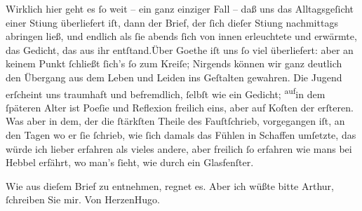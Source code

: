 \pstart
           Wirklich hier geht es{ }ſo weit – ein ganz einziger Fall – daß uns das Alltagsgeſicht
               einer Sti{\geminationm}ung überliefert iſt, dann der Brief, der{ }ſich
               dieſer Sti{\geminationm}ung nachmittags abringen ließ, und endlich
               als{ }ſie abends{ }ſich von innen erleuchtete und erwärmte, das Gedicht, das aus ihr
                  entſtand.\hspace*{1.5em}Über Goethe iſt uns{ }ſo viel überliefert: aber an keinem Punkt{ }ſchließt{ }ſich’s{ }ſo
               zum Kreiſe; Nirgends können wir ganz deutlich den Übergang aus dem Leben und Leiden
               ins Geſtalten gewahren. Die Jugend erſcheint uns traumhaft und befremdlich,{ }ſelbſt
               wie ein Gedicht; \substVorne{}\textsuperscript{auf}\substDazwischen{}in\substHinten{} dem{ }ſpäteren Alter ist Poeſie und Reflexion freilich eins, aber auf Koſten
               der erſteren. Was aber in dem, der die{ }ſtärkſten Theile des Fauſtſchrieb, vorgegangen iſt, an den Tagen wo er{ }ſie{ }ſchrieb,
               wie{ }ſich damals das Fühlen in Schaffen umſetzte, das würde ich lieber erfahren als
               vieles andere, aber freilich{ }ſo erfahren wie mans bei Hebbel erfährt, wo man’s{ }ſieht, wie durch ein Glasfenſter.\pend
           
\pstart
           Wie aus dieſem Brief zu entnehmen, regnet es. Aber ich wüßte \label{T_L01297-1v}\label{T_L01297-1} bitte
               Arthur,{ }ſchreiben Sie mir.\pend
           \pstart Von Herzen\spacefill\mbox{Hugo.}\pend{}\endnumbering{}  \newcommand{\dateiname}{L01297}\newcommand{\titel}{Hugo von Hofmannsthal an Arthur Schnitzler, 19. 6. [1903]}\newcommand{\editorInnen}{Martin Anton Müller und Gerd-Hermann Susen}
